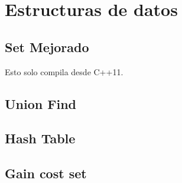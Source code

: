 \newpage
\section{Estructuras de datos}

\subsection{Set Mejorado}
Esto solo compila desde C++11.


\subsection{Union Find}
% 
% 


\newpage
\subsection{Hash Table}


\subsection{Gain cost set}


